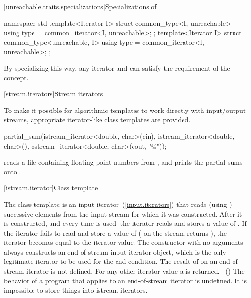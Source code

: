 \begin{addedblock}
[unreachable.traits.specializations]{Specializations of }

%
\begin{itemdecl}
namespace std {
  template<Iterator I>
  struct common_type<I, unreachable> {
    using type = common_iterator<I, unreachable>;
  };
  template<Iterator I>
  struct common_type<unreachable, I> {
    using type = common_iterator<I, unreachable>;
  };
}
\end{itemdecl}

\begin{itemdescr}
\pnum
\enternote By specializing  this way, any iterator and
 can satisfy the  requirement of the
 concept.\exitnote
\end{itemdescr}

\end{addedblock}

[stream.iterators]{Stream iterators}

\pnum
To make it possible for algorithmic templates to work directly with input/output streams, appropriate
iterator-like
class templates
are provided.

\enterexample
\begin{codeblock}
partial_sum(istream_iterator<double, char>(cin),
  istream_iterator<double, char>(),
  ostream_iterator<double, char>(cout, "@\textbackslash@n"));
\end{codeblock}

reads a file containing floating point numbers from
,
and prints the partial sums onto
.
\exitexample

[istream.iterator]{Class template }

\pnum
{}%
The class template
is an input iterator~(\ref{input.iterators}) that
reads (using
)
successive elements from the input stream for which it was constructed.
After it is constructed, and every time
\tcode{++}
is used, the iterator reads and stores a value of
.
If the iterator fails to read and store a value of 
(
on the stream returns
),
the iterator becomes equal to the
iterator value.
The constructor with no arguments
always constructs
an end-of-stream input iterator object, which is the only legitimate iterator to be used
for the end condition.
The result of
on an end-of-stream iterator is not defined.
For any other iterator value a
is returned.
~()
The behavior of a program that applies  to an end-of-stream
iterator is undefined.
It is impossible to store things into istream iterators.

